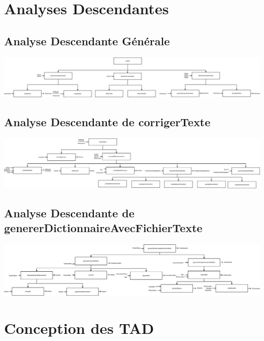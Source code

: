 \documentclass{article}
\begin{document}
\clearpage
\section{Analyses Descendantes}
  \subsection{Analyse Descendante Générale}
  \includegraphics[width=1\textwidth]{AD/AnalyseDescendante.eps}
  \subsection{Analyse Descendante de corrigerTexte}
  \includegraphics[width=1\textwidth]{AD/corrigerTexte.eps}
  \subsection{Analyse Descendante de genererDictionnaireAvecFichierTexte}
  \includegraphics[width=1\textwidth]{AD/genererDictionnaireAvecFichierTexte.eps}

\clearpage
\section{Conception des TAD}
	
	
	\clearpage
	
    
    \clearpage
    
	
	\clearpage

	
	\clearpage

	
	
\end{document}
